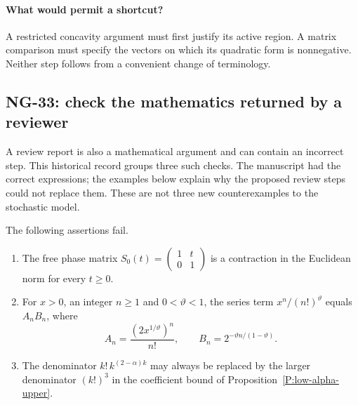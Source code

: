 \paragraph{What would permit a shortcut?}
A restricted concavity argument must first justify its active region.
A matrix comparison must specify the vectors on which its quadratic form
is nonnegative. Neither step follows from a convenient change of terminology.

\subsection{NG-33: check the mathematics returned by a reviewer}
\label{S:nogo-33}

A review report is also a mathematical argument and can contain an incorrect
step. This historical record groups three such checks. The manuscript had
the correct expressions; the examples below explain why the proposed review
steps could not replace them. These are not three new counterexamples to the
stochastic model.

\setcounter{nogo}{32}
\begin{nogo}\label{P:nogo-33}
  The following assertions fail.
  \begin{enumerate}
    \item The free phase matrix
      $S_0(t)=\left(\begin{smallmatrix}1&t\\0&1\end{smallmatrix}\right)$
      is a contraction in the Euclidean norm for every $t\ge0$.
    \item For $x>0$, an integer $n\ge1$ and $0<\vartheta<1$, the series term
      $x^n/(n!)^\vartheta$ equals
      $A_nB_n$, where
      \[
        A_n=\frac{(2x^{1/\vartheta})^n}{n!},\qquad
        B_n=2^{-\vartheta n/(1-\vartheta)}.
      \]
    \item The denominator $k!\,k^{(2-\alpha)k}$ may always be replaced by
      the larger denominator $(k!)^3$ in the coefficient bound of
      Proposition~\ref{P:low-alpha-upper}.
  \end{enumerate}
\end{nogo}

